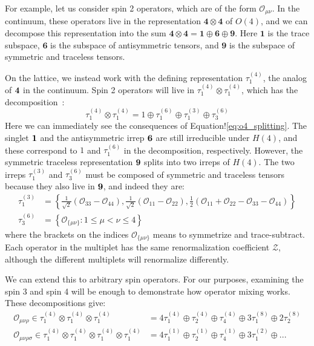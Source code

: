 \documentclass[11pt, oneside]{article}   	%
\theoremstyle{definition}
\begin{document}
For example, let us consider spin 2 operators, which are of the form $\mathcal O_{\mu\nu}$. In the continuum, these 
operators live in the representation $\mathbf{4}\otimes\mathbf{4}$ of $O(4)$, and we can decompose this representation 
into the sum $\mathbf{4}\otimes\mathbf{4} = \mathbf{1}\oplus\mathbf{6}\oplus\mathbf{9}$. Here $\mathbf{1}$ is the trace 
subspace, $\mathbf{6}$ is the subspace of antisymmetric tensors, and $\mathbf{9}$ is the subspace of symmetric and 
traceless tensors. 

On the lattice, we instead work with the defining representation $\tau_1^{(4)}$, the analog of $\bf{4}$ in the continuum. 
Spin 2 operators will live in $\tau_1^{(4)}\otimes\tau_1^{(4)}$, which has the decomposition~\cite{gockeler_mixing}:
\begin{equation}
	\tau_1^{(4)}\otimes \tau_1^{(4)} = 1\oplus \tau_1^{(6)}\oplus \tau_1^{(3)} \oplus \tau_3^{(6)}
\end{equation}
Here we can immediately see the consequences of Equation!\ref{eq:o4_splitting}. The singlet $\bf 1$ and the 
antisymmetric irrep $\bf 6$ are still irreducible under $H(4)$, and these correspond to $1$ and $\tau_1^{(6)}$ in the 
decomposition, respectively. However, the symmetric traceless representation $\bf 9$ splits into two irreps of $H(4)$. 
The two irreps $\tau_1^{(3)}$ and $\tau_3^{(6)}$ must be composed of symmetric and traceless tensors because 
they also live in $\bf 9$, and indeed they are:
\begin{align}
	\tau_1^{(3)} &= \left\{\frac{1}{\sqrt 2} (\mathcal O_{33} - \mathcal O_{44}), \frac{1}{\sqrt 2} (\mathcal O_{11} - \mathcal O_{22}), \frac{1}{2} (\mathcal O_{11} + 
	\mathcal O_{22} - \mathcal O_{33} - \mathcal O_{44})\right\} \\
	\tau_3^{(6)} &= \left\{\mathcal O_{\{\mu\nu\}} : 1\leq \mu < \nu \leq 4\right\}
\end{align}
where the brackets on the indices $\mathcal O_{\{\mu\nu\}}$ means to symmetrize and trace-subtract. Each operator 
in the multiplet has the same renormalization coefficient $\mathcal Z$, although the different multiplets will renormalize 
differently.

We can extend this to arbitrary spin operators. For our purposes, examining the spin 3 and spin 4 will be enough to 
demonstrate how operator mixing works. These decompositions give:
\begin{align}
	\mathcal O_{\mu\nu\rho} \in \tau_{1}^{(4)}\otimes \tau_{1}^{(4)}\otimes \tau_{1}^{(4)} &= 4\tau_{1}^{(4)}\oplus \tau_{2}^{(4)} \oplus \tau_{4}^{(4)} 
	\oplus 3\tau_{1}^{(8)} \oplus 2\tau_{2}^{(8)} \\
	\mathcal O_{\mu\nu\rho\sigma} \in \tau_{1}^{(4)}\otimes \tau_{1}^{(4)}\otimes \tau_{1}^{(4)}\otimes \tau_{1}^{(4)} &= 4\tau_{1}^{(1)} \oplus \tau_{2}^{(1)} 
	\oplus \tau_{4}^{(1)}\oplus 3\tau_1^{(2)} \oplus ...
\end{align}
\end{document}
